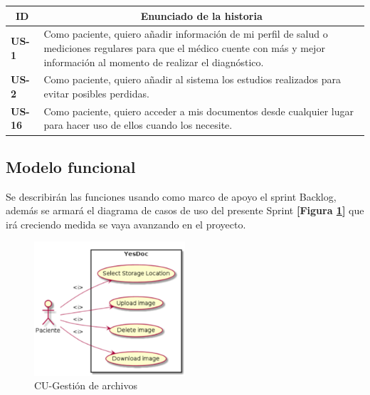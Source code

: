 \documentclass[a4paper,12pt]{article}
\begin{document}
\begin{table}[h]
    \label{US-Sprint7}
    \centering
	\begin{tabular}{|l|p{9cm}|}
	\hline
        \multicolumn{1}{|c|}{\textbf{ID}} &
        \multicolumn{1}{|c|}{\textbf{Enunciado de la historia}} \\          
    \hline
        \textbf{US-1 } & Como paciente, quiero  añadir información de mi perfil de salud o mediciones regulares para que el médico cuente con más y mejor información al momento de realizar el diagnóstico. \\
    \hline
        \textbf{US-2 } & Como paciente, quiero añadir al sistema los estudios realizados para evitar posibles perdidas.\\
     \hline
        \textbf{US-16 } & Como paciente, quiero acceder a mis documentos desde cualquier lugar para hacer uso de ellos cuando los necesite.\\
     \hline   
     
    \end{tabular}
\end{table}

\subsection{Modelo funcional} 
Se describirán las funciones usando como marco de apoyo el sprint Backlog, además se armará el diagrama de casos de uso del presente Sprint \textbf{[Figura \ref{6-cu_file_upload}]} que irá creciendo  medida se vaya avanzando en el proyecto.

    \begin{figure}[h]
        \centering
        \includegraphics[width=0.5\textwidth]{img/cu_file_upload}
        \caption{CU-Gestión de archivos}
		\label{6-cu_file_upload}
    \end{figure}
    
\newpage
\end{document}
